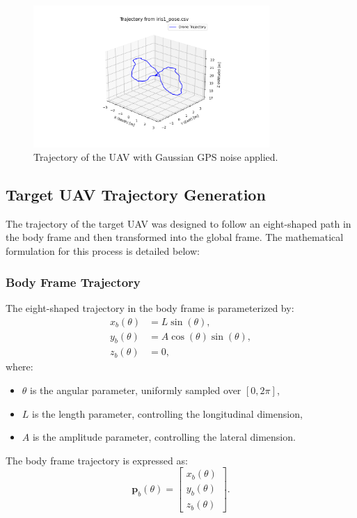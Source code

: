 \begin{figure}[H]
    \centering
    \includegraphics[width=0.8\textwidth]{Imgs/noised_traj.png}
    \caption{Trajectory of the UAV with Gaussian GPS noise applied.}
    \label{fig:noised_trajectory}
\end{figure}


\subsection{Target UAV Trajectory Generation}

The trajectory of the target UAV was designed to follow an eight-shaped path in the body frame and then transformed into the global frame. The mathematical formulation for this process is detailed below:

\subsubsection{ Body Frame Trajectory}
The eight-shaped trajectory in the body frame is parameterized by:
\[
\begin{aligned}
    x_b(\theta) &= L \sin(\theta), \\
    y_b(\theta) &= A \cos(\theta) \sin(\theta), \\
    z_b(\theta) &= 0,
\end{aligned}
\]
where:
\begin{itemize}
    \item \( \theta \) is the angular parameter, uniformly sampled over \([0, 2\pi]\),
    \item \( L \) is the length parameter, controlling the longitudinal dimension,
    \item \( A \) is the amplitude parameter, controlling the lateral dimension.
\end{itemize}

The body frame trajectory is expressed as:
\[
\mathbf{p}_b(\theta) = 
\begin{bmatrix}
    x_b(\theta) \\
    y_b(\theta) \\
    z_b(\theta)
\end{bmatrix}.
\]

